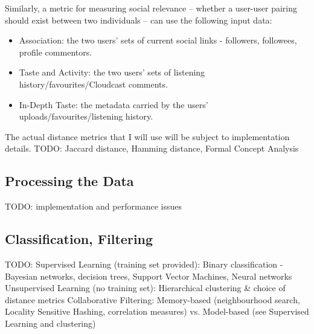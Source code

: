 Similarly, a metric for measuring social relevance -- whether a user-user pairing should exist between two individuals -- can use the following input data:
\begin{itemize}
 \item Association: the two users' sets of current social links - followers, followees, profile commentors. 
 \item Taste and Activity: the two users' sets of listening history/favourites/Cloudcast comments.
 \item In-Depth Taste: the metadata carried by the users' uploads/favourites/listening history.
\end{itemize}

The actual distance metrics that I will use will be subject to implementation details. TODO: Jaccard distance, Hamming distance, Formal Concept Analysis

\subsection*{Processing the Data}

TODO: implementation and performance issues

\subsection*{Classification, Filtering}

TODO: 
Supervised Learning (training set provided): Binary classification - Bayesian networks, decision trees, Support Vector Machines, Neural networks
Unsupervised Learning (no training set): Hierarchical clustering \& choice of distance metrics
Collaborative Filtering: Memory-based (neighbourhood search, Locality Sensitive Hashing, correlation measures) vs. Model-based (see Supervised Learning and clustering)


